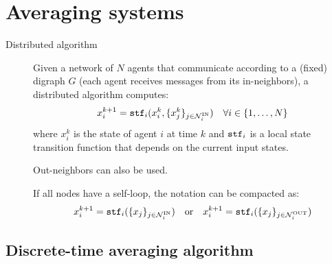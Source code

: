\chapter{Averaging systems}


\begin{description}
    \item[Distributed algorithm] 
        Given a network of $N$ agents that communicate according to a (fixed) digraph $G$ (each agent receives messages from its in-neighbors), a distributed algorithm computes:
        \[ x_i^{k+1} = {\texttt{stf}}_i(x_i^k, \{ x_j^k \}_{j \in \mathcal{N}_i^\text{IN}}) \quad \forall i \in \{ 1, \dots, N \} \]
        where $x_i^k$ is the state of agent $i$ at time $k$ and ${\texttt{stf}}_i$ is a local state transition function that depends on the current input states.

        \begin{remark}
            Out-neighbors can also be used.
        \end{remark}

        \begin{remark}
            If all nodes have a self-loop, the notation can be compacted as:
            \[ 
            x_i^{k+1} = {\texttt{stf}}_i(\{ x_j \}_{j \in \mathcal{N}_i^\text{IN}}) 
            \quad
            \text{or}
            \quad
            x_i^{k+1} = {\texttt{stf}}_i(\{ x_j \}_{j \in \mathcal{N}_i^\text{OUT}})
            \]
        \end{remark}
\end{description}



\section{Discrete-time averaging algorithm}


